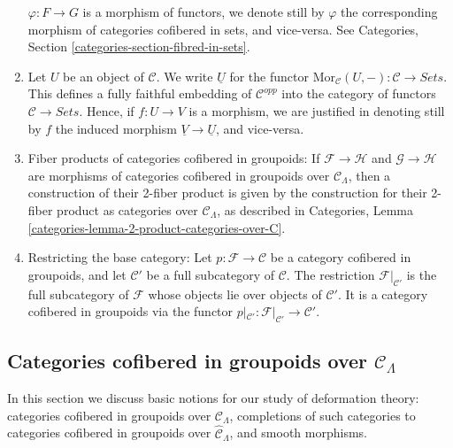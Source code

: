 \begin{remarks}
\begin{enumerate}
$\varphi : F \to G$ is a morphism of functors, we denote still by $\varphi$
the corresponding morphism of categories cofibered in sets, and vice-versa.
See Categories, Section \ref{categories-section-fibred-in-sets}.
\item 
\label{item-definition-yoneda}
Let $U$ be an object of $\mathcal{C}$.  We write $\underline{U}$ for the
functor 
$\text{Mor}_{\mathcal{C}}(U,-): \mathcal{C} \to 
\textit{Sets}$.  This defines a fully faithful embedding of $\mathcal 
C^{opp}$ into the category of functors $\mathcal{C} \to 
\textit{Sets}$. Hence, if $f: U \to V$ is a morphism, we are 
justified in denoting still by $f$ the induced morphism $\underline{V} 
\to \underline{U}$, and vice-versa.
\item Fiber products of categories cofibered in groupoids: If $\mathcal{F} 
\to \mathcal H$ and $\mathcal G \to \mathcal H$ are morphisms 
of categories cofibered in groupoids over $\mathcal{C}_\Lambda$, then a 
construction of their 2-fiber product is given by the construction for their 
2-fiber product as categories over $\mathcal{C}_\Lambda$, as described in 
Categories, Lemma \ref{categories-lemma-2-product-categories-over-C}.
\item 
\label{item-definition-restricting-base-category}
Restricting the base category: Let $p : \mathcal{F} \to \mathcal{C}$ be a
category cofibered in groupoids, and let $\mathcal{C}'$ be a full
subcategory of $\mathcal{C}$. The restriction $\mathcal{F}|_{\mathcal{C}'}$
is the full subcategory of $\mathcal{F}$ whose objects lie over
objects of $\mathcal{C}'$. It is a category cofibered in groupoids via
the functor
$p|_{\mathcal{C}'}: \mathcal{F}|_{\mathcal{C}'} \to \mathcal{C}'$.
\end{enumerate}
\end{remarks}









\subsection{Categories cofibered in groupoids over $\mathcal{C}_\Lambda$}
\label{subsection-cofibered-groupoids}

\noindent
In this section we discuss basic notions for our study of deformation
theory: categories cofibered in groupoids over $\mathcal{C}_\Lambda$,
completions of such categories to categories cofibered in groupoids
over $\widehat{\mathcal{C}}_\Lambda$, and smooth morphisms.

